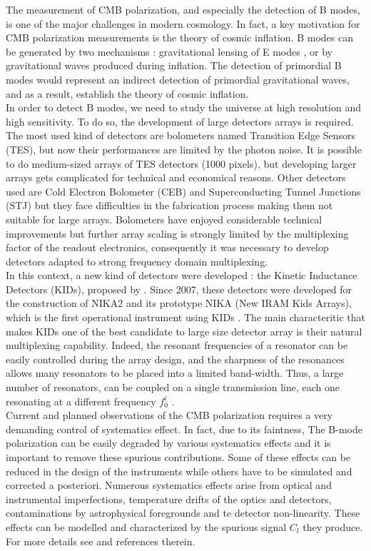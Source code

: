 \documentclass[twocolumn, traditabstract]{aa}
\begin{document}
The measurement of CMB polarization, and especially the detection of B modes, is one of the major challenges in modern cosmology. In fact, a key motivation for CMB polarization measurements is the theory of cosmic inflation. B modes can be generated by two mechanisms : gravitational lensing of E modes \citep{2013PhRvL.111n1301H}, or by gravitational waves produced during inflation. The detection of primordial B modes would represent an indirect detection of primordial gravitational waves, and as a result, establish the theory of cosmic inflation.\\
In order to detect B modes, we need to study the universe at high resolution and high sensitivity. To do so, the development of large detectors arrays is required. 
The most used kind of detectors are bolometers named Transition Edge Sensors (TES), but now their performances are limited by the photon noise. It is possible to do medium-sized arrays of TES detectors (1000 pixels), but developing larger arrays gets complicated for technical and economical reasons. Other detectors used are Cold Electron Bolometer (CEB) \citep{2007stt..conf...93K} and Superconducting Tunnel Junctions (STJ) but they face difficulties in the fabrication process making them not suitable for large arrays. Bolometers have enjoyed considerable technical improvements but further array scaling is strongly limited by the multiplexing factor of the readout electronics, consequently it was necessary to develop detectors adapted to strong frequency domain multiplexing.\\
In this context, a new kind of detectors were developed : the Kinetic Inductance Detectors (KIDs), proposed by \citet{2003Natur.425..817D}. Since 2007, these detectors were developed for the construction of NIKA2 and its prototype NIKA (New IRAM Kids Arrays), which is the first operational instrument using KIDs \citep{2010A&A...521A..29M,2016JLTP..184..816C}. The main characteritic that makes KIDs one of the best candidate to large size detector array is their natural multiplexing capability. Indeed, the resonant frequencies of a resonator can be easily controlled during the array design, and the sharpness of the resonances allows many resonators to be placed into a limited band-width. Thus, a large number of resonators, can be coupled on a single transmission line, each one resonating at a different frequency $f_{0}^{i}$ \citep{2010A&A...521A..29M, Calvo2008}.\\
Current and planned observations of the CMB polarization requires a very demanding control of systematics effect. In fact, due to its faintness, The B-mode polarization can be easily degraded by various systematics effects and it is important to remove these spurious contributions. Some of these effects can be reduced in the design of the instruments while others have to be simulated and corrected a posteriori. Numerous systematics effects arise from optical and instrumental imperfections, temperature drifts of the optics and detectors, contaminations by astrophysical foregrounds and te detector non-linearity. These effects can be modelled and characterized by the spurious signal $C_{l}$ they produce. For more details see \citep{2008PhRvD..77h3003S, quickpol} and references therein.\\
\end{document}
